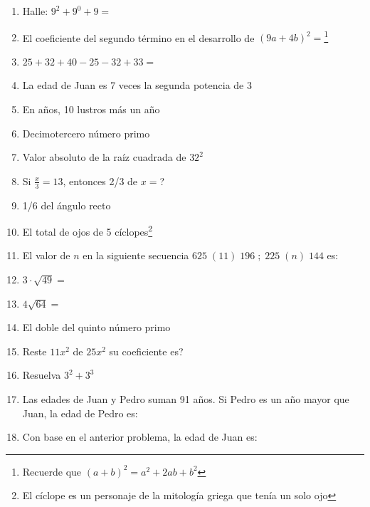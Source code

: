 \documentclass[letterpaper,10pt,twoside]{article}
\begin{document}
\begin{multicols}{2}
\begin{enumerate}
 \item Halle: $9^{2}+9^{0}+9=$
 \item El coeficiente del segundo término en el desarrollo de $(9a+4b)^{2}=$\footnote{Recuerde que $(a+b)^{2}=a^{2}+2ab+b^{2}$}
 \item $25+32+40-25-32+33=$
 \item La edad de Juan es 7 veces la segunda potencia de 3
 \item En años, 10 lustros más un año
 \item Decimotercero número primo
 \item Valor absoluto de la raíz cuadrada de $32^{2}$
 \item Si $\frac{x}{3}=13$, entonces 2/3 de $x=$?
 \item 1/6 del ángulo recto
 \item El total de ojos de 5 cíclopes\footnote{El cíclope es un personaje de la mitología griega que tenía un solo ojo}
 \item El valor de $n$ en la siguiente secuencia $625\;(11)\;196\; ; \;225\;(n)\;144$ es:
 \item $3\cdot\sqrt{49}=$
 \item $4\sqrt{64}=$
 \item El doble del quinto número primo
 \item Reste $11x^{2}$ de $25x^{2}$ su coeficiente es?
 \item Resuelva $3^{2}+3^{3}$
 \item Las edades de Juan y Pedro suman 91 años. Si Pedro es un año mayor que Juan, la edad de Pedro es:
 \item Con base en el anterior problema, la edad de Juan es:
 \end{enumerate}
\end{multicols}
\end{document}
